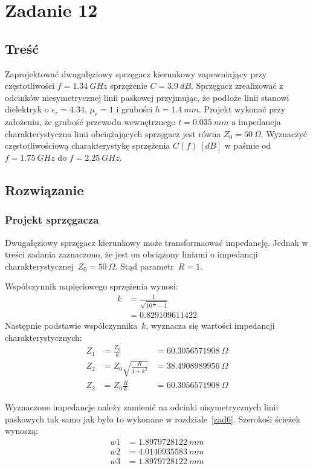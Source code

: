 \documentclass[rep.tex]{subfiles}
\begin{document}
\chapter{Zadanie 12}
\label{zad12}
\section{Treść}
Zaprojektować dwugałęziowy sprzęgacz kierunkowy zapewniający przy częstotliwości $f = 1.34~GHz$ sprzężenie $C = 3.9~dB$.
Sprzęgacz zrealizować z odcinków niesymetrycznej linii paskowej przyjmując, że podłoże linii stanowi dielektryk o $\epsilon_r = 4.34$, $\mu_r = 1$ i grubości $h = 1.4~mm$.
Projekt wykonać przy założeniu, że grubość przewodu wewnętrznego $t = 0.035~mm$ a impedancja charakterystyczna linii obciążających sprzęgacz jest równa $Z_0 = 50~\Omega$.
Wyznaczyć częstotliwościową charakterystykę sprzężenia $C(f)~[dB]$ w paśmie od $f = 1.75~GHz$ do $f = 2.25~GHz$.

\section{Rozwiązanie}
\subsection{Projekt sprzęgacza}
Dwugałęziowy sprzęgacz kierunkowy może transformaować impedancję.
Jednak w treści zadania zaznaczono, że jest on obciążony liniami o impedancji charakterystycznej~$Z_0 = 50~\Omega$.
Stąd parametr~$R = 1$.

Współczynnik napięciowego sprzężenia wynosi:
\begin{align}
  k &= \frac{1}{\sqrt{10^{\frac{C}{10}} - 1}} \\
  &= 0.829109611422 \nonumber
\end{align}
Następnie podstawie wspólczynnika~$k$, wyznacza się wartości impedancji charakterystycznych:
\begin{align}
  Z_1 &= \frac{Z_0}{k} &= 60.3056571908~\Omega \\
  Z_2 &= Z_0\sqrt{\frac{R}{1 + k^2}} &= 38.4908989956~\Omega \\
  Z_3 &= Z_0\frac{R}{k} &= 60.3056571908~\Omega
\end{align}

Wyznaczone impedancje należy zamienić na odcinki nisymetrycznych linii paskowych tak samo jak było to wykonane w rozdziale~\ref{zad6}.
Szerokośi ścieżek wynoszą:
\begin{align}
  w1 &= 1.8979728122~mm \nonumber \\
  w2 &= 4.0140935583~mm \nonumber \\
  w3 &= 1.8979728122~mm \nonumber
\end{align}
\end{document}
